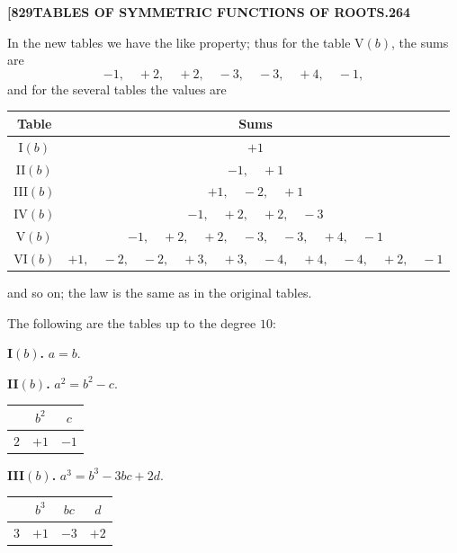 \documentclass[11pt,a4paper]{book}
\begin{document}
\newpage
\setcounter{page}{264}

\noindent\textbf{[829}\hfill\textbf{TABLES OF SYMMETRIC FUNCTIONS OF ROOTS.}\hfill\textbf{264}

\bigskip

\noindent In the new tables we have the like property; thus for the table V$(b)$, the sums are
\[
-1,\quad +2,\quad +2,\quad -3,\quad -3,\quad +4,\quad -1,
\]
and for the several tables the values are

\begin{center}
\begin{tabular}{c|c}
\textbf{Table} & \textbf{Sums} \\
\hline
I$(b)$ & $+1$ \\
II$(b)$ & $-1,\quad +1$ \\
III$(b)$ & $+1,\quad -2,\quad +1$ \\
IV$(b)$ & $-1,\quad +2,\quad +2,\quad -3$ \\
V$(b)$ & $-1,\quad +2,\quad +2,\quad -3,\quad -3,\quad +4,\quad -1$ \\
VI$(b)$ & $+1,\quad -2,\quad -2,\quad +3,\quad +3,\quad -4,\quad +4,\quad -4,\quad +2,\quad -1$
\end{tabular}
\end{center}

\medskip

\noindent and so on; the law is the same as in the original tables.

The following are the tables up to the degree $10$:

\medskip

\noindent\textbf{I$(b)$.} $a = b$.

\medskip

\noindent\textbf{II$(b)$.} $a^2 = b^2 - c$.
\begin{center}
\begin{tabular}{c|c|c}
& $b^2$ & $c$ \\
\hline
$2$ & $+1$ & $-1$
\end{tabular}
\end{center}

\medskip

\noindent\textbf{III$(b)$.} $a^3 = b^3 - 3bc + 2d$.
\begin{center}
\begin{tabular}{c|c|c|c}
& $b^3$ & $bc$ & $d$ \\
\hline
$3$ & $+1$ & $-3$ & $+2$
\end{tabular}
\end{center}
\end{document}
